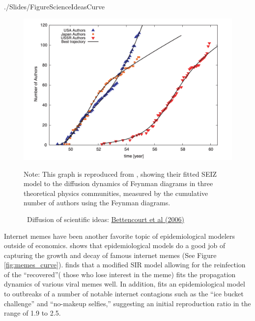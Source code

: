 
\begin{verbatimwrite}{./Slides/FigureScienceIdeasCurve}
	\begin{figure}[!ht] \centering  %
		\caption{ ~Diffusion of scientific ideas: \href{http://web.mit.edu/dikaiser/www/BAKC.PhysA.pdf}{Bettencourt et al (2006)}}\nocite{bettencourt2006power}
		\label{fig:science_ideas_curve}
		\centerline{\includegraphics[width=\textwidth]{./figures/Feynman}}
		\begin{flushleft}{\footnotesize Note: This graph is reproduced from \cite{bettencourt2006power}, showing their fitted SEIZ model to the diffusion dynamics of Feynman diagrams in three theoretical physics communities, measured by the cumulative number of authors using the Feynman diagrams.}
		\end{flushleft}
	\end{figure}
\end{verbatimwrite}%





Internet memes have been another favorite topic of epidemiological modelers outside of economics. \href{https://github.com/iworld1991/EpiExp/blob/master/Literature/bauckhage2011insights.pdf}{\cite{bauckhage2011insights}} shows that epidemiological models do a good job of capturing the growth and decay of famous internet memes (See Figure \ref{fig:memes_curve}).  \cite{wang2011epidemiological} finds that a modified SIR model allowing for the reinfection of the ``recovered''( those who lose interest in the meme) fits  the propagation dynamics of various viral memes well. In addition,   \href{https://github.com/iworld1991/EpiExp/blob/master/Literature/kucharski2016modelling.pdf}{\cite{kucharski2016modelling}} fits an epidemiological model to outbreaks of a number of notable internet contagions such as the ``ice bucket challenge'' and ``no-makeup selfies,'' suggesting an initial reproduction ratio in the range of 1.9 to 2.5.

